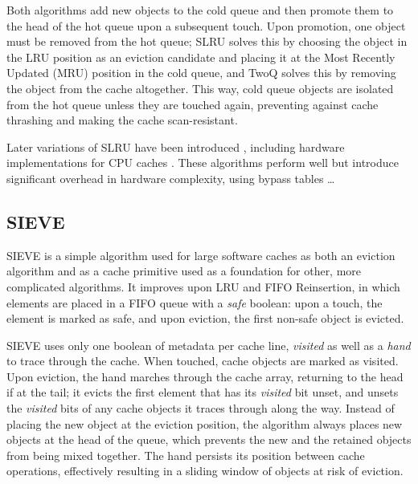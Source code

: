\documentclass[letterpaper, twocolumn]{article}
\begin{document}
Both algorithms add new objects to the cold queue
and then promote them to the head of the hot queue upon a subsequent touch.
Upon promotion, one object must be removed from the hot queue;
SLRU solves this by choosing the object in the LRU position as an eviction candidate
and placing it at the Most Recently Updated (MRU) position in the cold queue,
and TwoQ solves this by removing the object from the cache altogether.
This way, cold queue objects are isolated from the hot queue unless they are touched again,
preventing against cache thrashing and making the cache scan-resistant.

Later variations of SLRU have been introduced \cite{SSLRU},
including hardware implementations for CPU caches
\cite{DuelingSLRU}\cite{LimitedSLRU}\cite{FixedSLRU}\cite{FixedSLRUEnhancements}.
These algorithms perform well but introduce significant overhead in hardware complexity,
using bypass tables \dots

\subsection{SIEVE}

SIEVE is a simple algorithm used for large software caches as both an eviction algorithm
and as a cache primitive used as a foundation for other, more complicated algorithms.
It improves upon LRU and FIFO Reinsertion,
in which elements are placed in a FIFO queue with a \textit{safe} boolean:
upon a touch, the element is marked as safe, and upon eviction,
the first non-safe object is evicted.

SIEVE uses only one boolean of metadata per cache line, \textit{visited}
as well as a \textit{hand} to trace through the cache.
When touched, cache objects are marked as visited.
Upon eviction, the hand marches through the cache array, returning to the head if at the tail;
it evicts the first element that has its \textit{visited} bit unset,
and unsets the \textit{visited} bits of any cache objects it traces through along the way.
Instead of placing the new object at the eviction position,
the algorithm always places new objects at the head of the queue,
which prevents the new and the retained objects from being mixed together.
The hand persists its position between cache operations,
effectively resulting in a sliding window of objects at risk of eviction.
\end{document}
